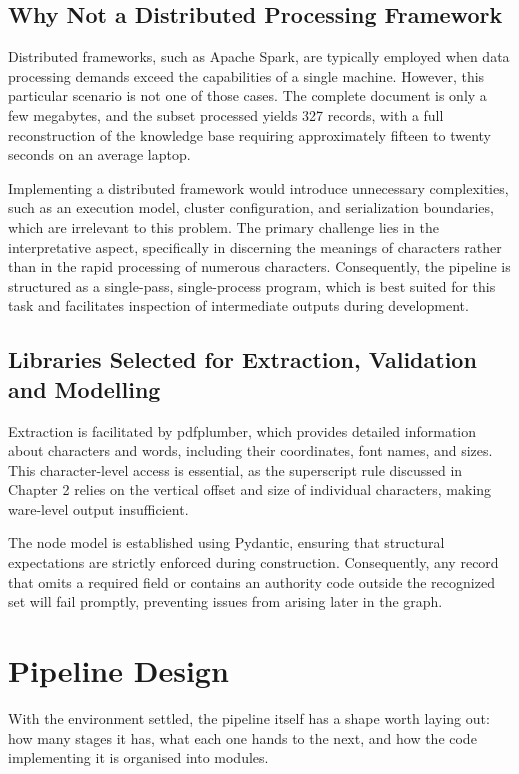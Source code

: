 \subsection{Why Not a Distributed Processing Framework}

Distributed frameworks, such as Apache Spark, are typically employed when data processing demands exceed the capabilities of a single machine. However, this particular scenario is not one of those cases. The complete document is only a few megabytes, and the subset processed yields 327 records, with a full reconstruction of the knowledge base requiring approximately fifteen to twenty seconds on an average laptop.

Implementing a distributed framework would introduce unnecessary complexities, such as an execution model, cluster configuration, and serialization boundaries, which are irrelevant to this problem. The primary challenge lies in the interpretative aspect, specifically in discerning the meanings of characters rather than in the rapid processing of numerous characters. Consequently, the pipeline is structured as a single-pass, single-process program, which is best suited for this task and facilitates inspection of intermediate outputs during development.

\subsection{Libraries Selected for Extraction, Validation and Modelling}

Extraction is facilitated by pdfplumber\citep{pdfplumber}, which provides detailed information about characters and words, including their coordinates, font names, and sizes. This character-level access is essential, as the superscript rule discussed in Chapter 2 relies on the vertical offset and size of individual characters, making ware-level output insufficient.

The node model is established using Pydantic\citep{pydantic_docs}, ensuring that structural expectations are strictly enforced during construction. Consequently, any record that omits a required field or contains an authority code outside the recognized set will fail promptly, preventing issues from arising later in the graph.

\section{Pipeline Design}

With the environment settled, the pipeline itself has a shape worth laying out: how many
stages it has, what each one hands to the next, and how the code implementing it is
organised into modules.

